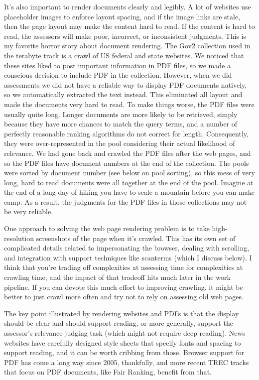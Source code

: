 \documentclass[nobib]{tufte-book}
\begin{document}
It's also important to render documents clearly and legibly.  A lot of websites use placeholder images to enforce layout spacing, and if the image links are stale, then the page layout may make the content hard to read.  If the content is hard to read, the assessors will make poor, incorrect, or inconsistent judgments.  This is my favorite horror story about document rendering.  The Gov2 collection used in the terabyte track is a crawl of US federal and state websites.  We noticed that these sites liked to post important information in PDF files, so we made a conscious decision to include PDF in the collection.  However, when we did assessments we did not have a reliable way to display PDF documents natively, so we automatically extracted the text instead.  This eliminated all layout and made the documents very hard to read. To make things worse, the PDF files were usually quite long.  Longer documents are more likely to be retrieved, simply because they have more chances to match the query terms, and a number of perfectly reasonable ranking algorithms do not correct for length.  Consequently, they were over-represented in the pool considering their actual likelihood of relevance.  We had gone back and crawled the PDF files after the web pages, and so the PDF files have document numbers at the end of the collection.  The pools were sorted by document number (see below on pool sorting), so this mess of very long, hard to read documents were all together at the end of the pool.  Imagine at the end of a long day of hiking you have to scale a mountain before you can make camp.  As a result, the judgments for the PDF files in those collections may not be very reliable.

One approach to solving the web page rendering problem is to take high-resolution screenshots of the page when it's crawled.  This has its own set of complicated details related to impersonating the browser, dealing with scrolling, and integration with support techniques like scanterms (which I discuss below).  I think that you're trading off complexities at assessing time for complexities at crawling time, and the impact of that tradeoff hits much later in the work pipeline.  If you can devote this much effort to improving crawling, it might be better to just crawl more often and try not to rely on assessing old web pages.

The key point illustrated by rendering websites and PDFs is that the display should be clear and should support reading, or more generally, support the assessor's relevance judging task (which might not require deep reading).  News websites have carefully designed style sheets that specify fonts and spacing to support reading, and it can be worth cribbing from those.  Browser support for PDF has come a long way since 2005, thankfully, and more recent TREC tracks that focus on PDF documents, like Fair Ranking, benefit from that.
\end{document}

